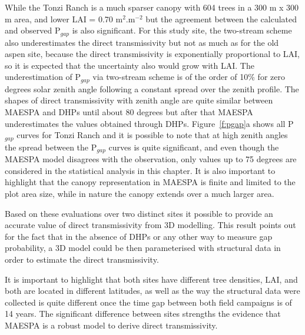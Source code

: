 While the Tonzi Ranch is a much sparser canopy with 604 trees in a 300 m x 300 m area, and lower LAI = 0.70 m$^{2}$.m$^{-2}$ but the agreement between the calculated and observed P$_{gap}$ is also significant. For this study site, the two-stream scheme also underestimates the direct transmissivity but not as much as for the old aspen site, because the direct transmissivity is exponentially proportional to LAI, so it is expected that the uncertainty also would grow with LAI. The underestimation of P$_{gap}$ via two-stream scheme is of the order of 10\% for zero degrees solar zenith angle following a constant spread over the zenith profile. The shapes of direct transmissivity with zenith angle are quite similar between MAESPA and DHPs until about 80 degrees but after that MAESPA underestimates the values obtained through DHPs. Figure~\ref{f:pgap}a shows all P$_{gap}$ curves for Tonzi Ranch and it is possible to note that at high zenith angles the spread between the P$_{gap}$ curves is quite significant, and even though the MAESPA model disagrees with the observation, only values up to 75 degrees are considered in the statistical analysis in this chapter. It is also important to highlight that the canopy representation in MAESPA is finite and limited to the plot area size, while in nature the canopy extends over a much larger area.

Based on these evaluations over two distinct sites it possible to provide an accurate value of direct transmissivity from 3D modelling. This result points out for the fact that in the absence of DHPs or any other way to measure gap probability, a 3D model could be then parameterised with structural data in order to estimate the direct transmissivity. 

It is important to highlight that both sites have different tree densities, LAI, and both are located in different latitudes, as well as the way the structural data were collected is quite different once the time gap between both field campaigns is of 14 years. The significant difference between sites strengths the evidence that MAESPA is a robust model to derive direct transmissivity.

